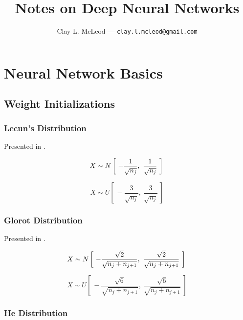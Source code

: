 \documentclass[12pt]{article}
\title{Notes on Deep Neural Networks}
\author{Clay L. McLeod --- \texttt{clay.l.mcleod@gmail.com}}
\begin{document}
\maketitle

\section{Neural Network Basics}
\subsection{Weight Initializations}

\subsubsection{Lecun's Distribution}

Presented in \cite[Sec 4.6]{efficient-backprop}.

\begin{equation}
    X \sim N \left[~-\frac{1}{\sqrt{n_{j}}},~\frac{1}{\sqrt{n_{j}}}~\right]\\
    \label{eq:lecun:normal}
\end{equation}


\begin{equation}
    X \sim U \left[~-\frac{3}{\sqrt{n_{j}}},~\frac{3}{\sqrt{n_{j}}}~\right]
    \label{eq:lecun:uniform}
\end{equation}

\subsubsection{Glorot Distribution}

Presented in \cite[4.2]{glorot10}.

\begin{equation}
    X \sim N \left[~-\frac{\sqrt{2}}{\sqrt{n_{j} + n_{j+1}}},~\frac{\sqrt{2}}{\sqrt{n_{j} + n_{j+1}}}~\right]\\
    \label{eq:glorot:normal}
\end{equation}

\begin{equation}
    X \sim U \left[~-\frac{\sqrt{6}}{\sqrt{n_{j} + n_{j+1}}},~\frac{\sqrt{6}}{\sqrt{n_{j} + n_{j+1}}}~\right]
    \label{eq:glorot:uniform}
\end{equation}

\subsubsection{He Distribution}
\end{document}
